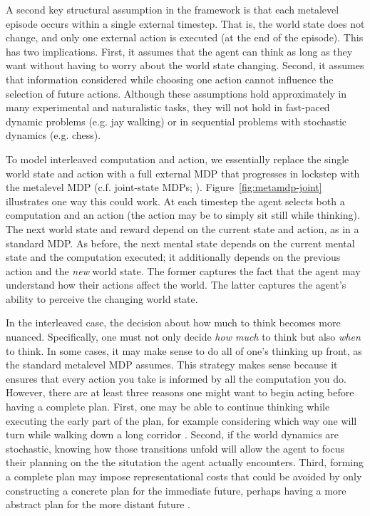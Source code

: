 A second key structural assumption in the framework is that each metalevel episode occurs within a single external timestep. That is, the world state does not change, and only one external action is executed (at the end of the episode). This has two implications. First, it assumes that the agent can think as long as they want without having to worry about the world state changing. Second, it assumes that information considered while choosing one action cannot influence the selection of future actions. Although these assumptions hold approximately in many experimental and naturalistic tasks, they will not hold in fast-paced dynamic problems (e.g. jay walking) or in sequential problems with stochastic dynamics (e.g. chess).

To model interleaved computation and action, we essentially replace the single world state and action with a full external MDP that progresses in lockstep with the metalevel MDP (c.f. joint-state MDPs; \citealp{russell1991right,parr1998reinforcement,hay2016principles}). Figure~\ref{fig:metamdp-joint} illustrates one way this could work. At each timestep the agent selects both a computation and an action (the action may be to simply sit still while thinking). The next world state and reward depend on the current state and action, as in a standard MDP. As before, the next mental state depends on the current mental state and the computation executed; it additionally depends on the previous action and the \emph{new} world state. The former captures the fact that the agent may understand how their actions affect the world. The latter captures the agent's ability to perceive the changing world state.

In the interleaved case, the decision about how much to think becomes more nuanced. Specifically, one must not only decide \emph{how much} to think but also \emph{when} to think. In some cases, it may make sense to do all of one's thinking up front, as the standard metalevel MDP assumes. This strategy makes sense because it ensures that every action you take is informed by all the computation you do. However, there are at least three reasons one might want to begin acting before having a complete plan. First, one may be able to continue thinking while executing the early part of the plan, for example considering which way one will turn while walking down a long corridor \citep{oceallaigh2015metareasoning}. Second, if the world dynamics are stochastic, knowing how those transitions unfold will allow the agent to focus their planning on the the situtation the agent actually encounters. Third, forming a complete plan may impose representational costs that could be avoided by only constructing a concrete plan for the immediate future, perhaps having a more abstract plan for the more distant future \citep{ho2020efficiency}.


